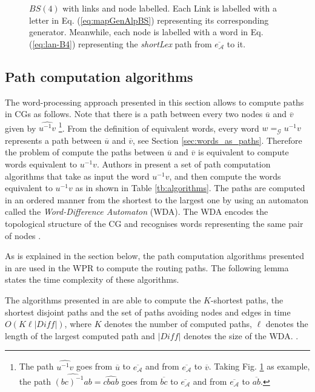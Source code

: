 \begin{figure}
    \centering
    
    \caption{$BS(4)$ with  links and node labelled. Each Link is labelled with a letter in Eq. (\ref{eq:mapGenAlpBS}) representing its corresponding generator. Meanwhile, each node is labelled with a word in Eq. (\ref{eq:lan-B4}) representing the \textit{shortLex} path from $\overline{e_\mathcal{A}}$ to it.}
    \label{fig:BS4_nodeEdgeLabelled}
\end{figure}

\subsection{Path computation algorithms}
\label{sec:path_algorithms}

The word-processing approach presented in this section allows to compute paths in CGs as follows.
Note that there is a path between every two nodes $\overline{u}$ and $\overline{v}$ given by $\widehat{u^{-1}v}$ \footnote{The path $\widehat{u^{-1}v}$ goes from $\overline{u}$ to  $\overline{e_\mathcal{A}}$ and from  $\overline{e_\mathcal{A}}$ to  $\overline{v}$. Taking Fig. \ref{fig:BS4_nodeEdgeLabelled} as example, the path $\widehat{(bc)^{-1}ab}=\widehat{cbab}$ goes from $\overline{bc}$ to $\overline{e_\mathcal{A}}$ and from $\overline{e_\mathcal{A}}$ to $\overline{ab}$.}. From the definition of equivalent words, every word $w=_\mathcal{G}u^{-1}v$ represents a path between $\overline{u}$ and $\overline{v}$, see Section \ref{sec:words_as_paths}. Therefore the problem of compute the paths between    $\overline{u}$ and $\overline{v}$ is equivalent to compute words equivalent to $u^{-1}v$. Authors in \cite{AGUIRREGUERRERO2019218} present a set of path computation algorithms that take as input the word $u^{-1}v$, and then compute the words equivalent to $u^{-1}v$ as in shown in Table \ref{tb:algorithms}.
The paths are computed in an ordered manner from the shortest to the largest one by using an automaton called the \textit{Word-Difference Automaton} (WDA). The WDA encodes the topological structure of the CG and recognises words representing the same pair of nodes \cite[Section 13.2.2]{derekHCGT}.



As is explained in the section below, the path computation algorithms presented in \cite{AGUIRREGUERRERO2019218} are used in the WPR to compute the routing paths. 
The following lemma states the time complexity of these algorithms.

\begin{lemma}
\label{lem:pc_alg}
The algorithms presented in \cite{AGUIRREGUERRERO2019218} are able to compute the $K$-shortest paths, the shortest disjoint paths and the set of paths avoiding nodes and edges in time $O(K\ell|Diff|)$, where $K$ denotes the number of computed paths, $\ell$ denotes the length of the largest computed path and $|Diff|$ denotes the size of the WDA. \cite[Colloraries 5-7 ]{AGUIRREGUERRERO2019218}.
\end{lemma}
